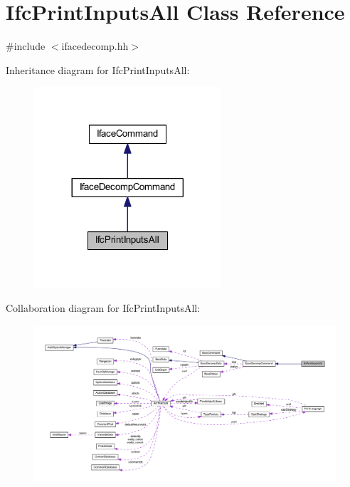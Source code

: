 \hypertarget{class_ifc_print_inputs_all}{}\section{Ifc\+Print\+Inputs\+All Class Reference}
\label{class_ifc_print_inputs_all}


{\ttfamily \#include $<$ifacedecomp.\+hh$>$}



Inheritance diagram for Ifc\+Print\+Inputs\+All\+:
\nopagebreak
\begin{figure}[H]
\begin{center}
\leavevmode
\includegraphics[width=197pt]{class_ifc_print_inputs_all__inherit__graph}
\end{center}
\end{figure}


Collaboration diagram for Ifc\+Print\+Inputs\+All\+:
\nopagebreak
\begin{figure}[H]
\begin{center}
\leavevmode
\includegraphics[width=350pt]{class_ifc_print_inputs_all__coll__graph}
\end{center}
\end{figure}

